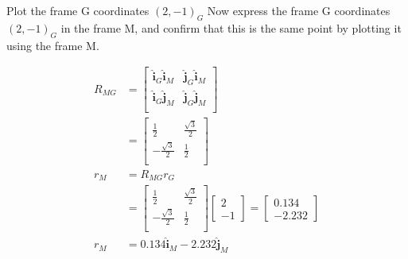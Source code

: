 Plot the frame G coordinates $(2, -1)_G$ Now express the frame G coordinates $(2, -1)_G$ in the frame M, and confirm that this is the same point by plotting it using the frame M.

\begin{solution}
\begin{align*}
    R_{MG} &= \begin{bmatrix}
        \boldsymbol{\hat{i}}_G \boldsymbol{\hat{i}}_M & \boldsymbol{\hat{j}}_G \boldsymbol{\hat{i}}_M \\
        \boldsymbol{\hat{i}}_G \boldsymbol{\hat{j}}_M & \boldsymbol{\hat{j}}_G \boldsymbol{\hat{j}}_M \\
    \end{bmatrix} \\
    &= \begin{bmatrix}
        \frac{1}{2} & \frac{\sqrt{3}}{2} \\
        -\frac{\sqrt{3}}{2} & \frac{1}{2} \\
    \end{bmatrix} \\
    r_M &= R_{MG} r_G \\
    &= \begin{bmatrix}
        \frac{1}{2} & \frac{\sqrt{3}}{2} \\
        -\frac{\sqrt{3}}{2} & \frac{1}{2} \\
    \end{bmatrix} \begin{bmatrix}
        2 \\ -1
    \end{bmatrix} = \begin{bmatrix}
        0.134 \\ -2.232
    \end{bmatrix} \\
    r_M &= 0.134 \boldsymbol{\hat{i}}_M - 2.232 \boldsymbol{\hat{j}}_M
\end{align*}

\begin{center}
\end{center}
\end{solution}